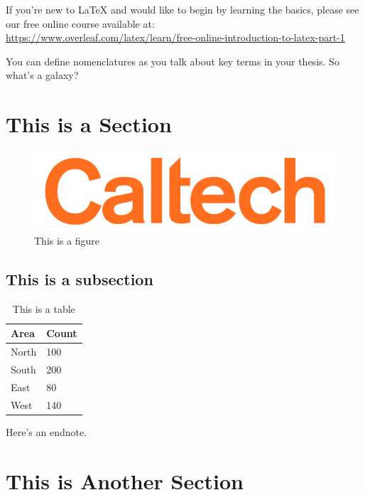 \documentclass[12pt]{caltech_thesis}
\begin{document}
If you're new to \LaTeX{} and would like to begin by learning the basics, please see our free online course available at:\\ \url{https://www.overleaf.com/latex/learn/free-online-introduction-to-latex-part-1} 

You can define nomenclatures  as you talk about key terms in your thesis. So what's a galaxy? %


\section{This is a Section}
\lipsum[1-2]

\begin{figure}[hbt!]
\centering
\includegraphics[width=.3\textwidth]{caltech.png}
\caption{This is a figure}\label{fig:logo}
\end{figure}

\subsection{This is a subsection}

\begin{table}[hbt!]
\centering
\begin{tabular}{ll}
\hline
Area & Count\\
\hline
North & 100\\
South & 200\\
East & 80\\
West & 140\\
\hline
\end{tabular}
\caption{This is a table}\label{tab:sample}
\end{table}

\lipsum[3] 

\lipsum[4-5] 

Here's an endnote.

\section{This is Another Section}
\lipsum[6-7] 
\end{document}
